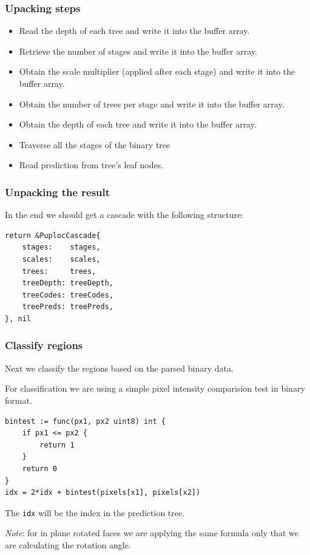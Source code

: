 \documentclass[9pt]{beamer}
\begin{document}
\begin{frame}[fragile]
\frametitle{Upacking steps}


\begin{itemize}
\item Read the depth of each tree and write it into the buffer array.
\item Retrieve the number of stages and write it into the buffer array.
\item Obtain the scale multiplier (applied after each stage) and write it into the buffer array.
\item Obtain the number of trees per stage and write it into the buffer array.
\item Obtain the depth of each tree and write it into the buffer array.
\item Traverse all the stages of the binary tree
\item Read prediction from tree's leaf nodes.
\end{itemize}


\end{frame}

\begin{frame}[fragile]
\frametitle{Unpacking the result}


In the end we should get a cascade with the following structure:



\begin{verbatim}
return &PuplocCascade{
    stages:    stages,
    scales:    scales,
    trees:     trees,
    treeDepth: treeDepth,
    treeCodes: treeCodes,
    treePreds: treePreds,
}, nil

\end{verbatim}



\end{frame}

\begin{frame}[fragile]
\frametitle{Classify regions}


Next we classify the regions based on the parsed binary data.


For classification we are using a simple pixel intensity comparision test in binary format.



\begin{verbatim}
bintest := func(px1, px2 uint8) int {
    if px1 <= px2 {
        return 1
    }
    return 0
}
idx = 2*idx + bintest(pixels[x1], pixels[x2])

\end{verbatim}


The \texttt{idx} will be the index in the prediction tree.


\emph{Note}: for in plane rotated faces we are applying the same formula only that we are calculating the rotation angle.



\end{frame}
\end{document}

